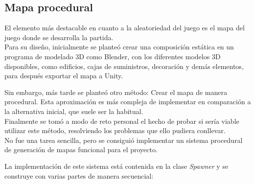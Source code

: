 \subsection{Mapa procedural}
El elemento más destacable en cuanto a la aleatoriedad del juego es el mapa del juego donde se desarrolla la partida.\\
Para su diseño, inicialmente se planteó crear una composición estática en un programa de modelado 3D como Blender, con los diferentes modelos 3D disponibles, como edificios, cajas de suministros, decoración y demás elementos, para después exportar el mapa a Unity.

Sin embargo, más tarde se planteó otro método: Crear el mapa de manera procedural. Esta aproximación es más compleja de implementar en comparación a la alternativa inicial, que suele ser la habitual.\\
Finalmente se tomó a modo de reto personal el hecho de probar si sería viable utilizar este método, resolviendo los problemas que ello pudiera conllevar.\\
No fue una tarea sencilla, pero se consiguió implementar un sistema procedural de generación de mapas funcional para el proyecto.

La implementación de este sistema está contenida en la clase \textit{Spawner} y se construye con varias partes de manera secuencial:

